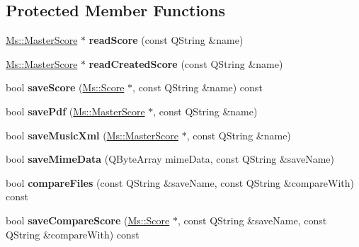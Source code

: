 \subsection*{Protected Member Functions}
\begin{DoxyCompactItemize}
\item 
\mbox{\label{class_ms_1_1_m_test_ac35525fff12b9e2d07806bcd6602217e}} 
\hyperlink{class_ms_1_1_master_score}{Ms\+::\+Master\+Score} $\ast$ {\bfseries read\+Score} (const Q\+String \&name)
\item 
\mbox{\label{class_ms_1_1_m_test_af3c0a9c8bd7784086f966faf701429d3}} 
\hyperlink{class_ms_1_1_master_score}{Ms\+::\+Master\+Score} $\ast$ {\bfseries read\+Created\+Score} (const Q\+String \&name)
\item 
\mbox{\label{class_ms_1_1_m_test_a9191a2086f4eb17a64eb466327c74452}} 
bool {\bfseries save\+Score} (\hyperlink{class_ms_1_1_score}{Ms\+::\+Score} $\ast$, const Q\+String \&name) const
\item 
\mbox{\label{class_ms_1_1_m_test_a58c9c58bc05dec98a8a1b783e18a1703}} 
bool {\bfseries save\+Pdf} (\hyperlink{class_ms_1_1_master_score}{Ms\+::\+Master\+Score} $\ast$, const Q\+String \&name)
\item 
\mbox{\label{class_ms_1_1_m_test_a740ba0e9f2c5ebc6e0937ed9dd0da64f}} 
bool {\bfseries save\+Music\+Xml} (\hyperlink{class_ms_1_1_master_score}{Ms\+::\+Master\+Score} $\ast$, const Q\+String \&name)
\item 
\mbox{\label{class_ms_1_1_m_test_a8e9111673d6bb2ed25851e4fa7858d03}} 
bool {\bfseries save\+Mime\+Data} (Q\+Byte\+Array mime\+Data, const Q\+String \&save\+Name)
\item 
\mbox{\label{class_ms_1_1_m_test_a37e6c16e898cab655f8ccd2518274acf}} 
bool {\bfseries compare\+Files} (const Q\+String \&save\+Name, const Q\+String \&compare\+With) const
\item 
\mbox{\label{class_ms_1_1_m_test_a686ee7797f648e1d0e47e405ca90f92c}} 
bool {\bfseries save\+Compare\+Score} (\hyperlink{class_ms_1_1_score}{Ms\+::\+Score} $\ast$, const Q\+String \&save\+Name, const Q\+String \&compare\+With) const

\end{DoxyCompactItemize}
